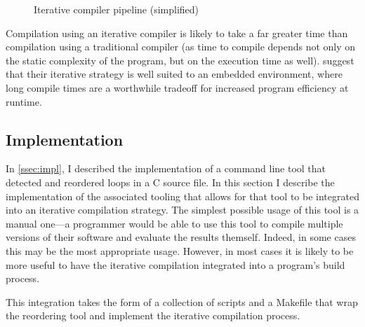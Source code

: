 \documentclass[journal]{IEEEtran}
\begin{document}
\begin{figure}[h] 
  \centering 
  \caption{Iterative compiler pipeline (simplified)} 
  \label{fig:pipeline-dynamic}
\end{figure}

Compilation using an iterative compiler is likely to take a far greater time
than compilation using a traditional compiler (as time to compile depends not
only on the static complexity of the program, but on the execution time as
well). \textcite{fursin_evaluating_2002} suggest that their iterative strategy
is well suited to an embedded environment, where long compile times are a
worthwhile tradeoff for increased program efficiency at runtime.

\subsection{Implementation}

In \autoref{ssec:impl}, I described the implementation of a command line tool
that detected and reordered loops in a C source file. In this section I describe
the implementation of the associated tooling that allows for that tool to be
integrated into an iterative compilation strategy. The simplest possible usage
of this tool is a manual one---a programmer would be able to use this tool to
compile multiple versions of their software and evaluate the results themself.
Indeed, in some cases this may be the most appropriate usage. However, in most
cases it is likely to be more useful to have the iterative compilation
integrated into a program's build process.

This integration takes the form of a collection of scripts and a Makefile that
wrap the reordering tool and implement the iterative compilation process.
\end{document}
